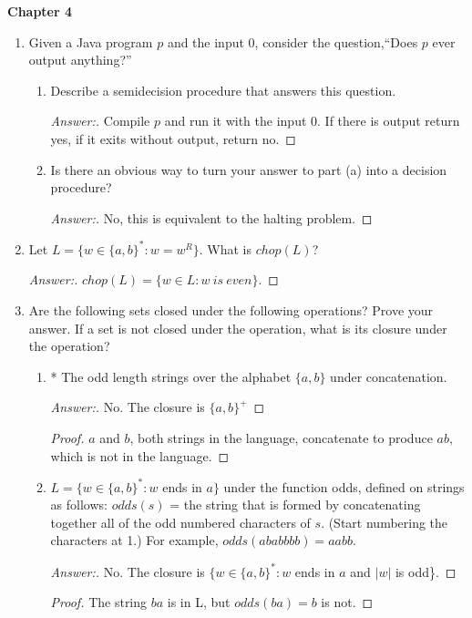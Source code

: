 \documentclass[10pt]{article}
\newcommand{\card}[1]{\left| #1 \right|}
\newcommand{\chtitle}[1]{\noindent \vspace{5mm}\textbf{Chapter #1}\vspace{3mm}}
\begin{document}
\chtitle{4}
\begin{enumerate}


\item
Given a Java program $p$ and the input $0$, consider the question,``Does $p$ ever output anything?''
\begin{enumerate}

\item
Describe a semidecision procedure that answers this question.
\begin{proof}[Answer:]
Compile $p$ and run it with the input $0$.  If there is output return yes, if it exits without output, return no.
\end{proof}

\item
Is there an obvious way to turn your answer to part (a) into a decision procedure?
\begin{proof}[Answer:]
No, this is equivalent to the halting problem.
\end{proof}
\end{enumerate}


\item
Let $L = \{w \in \{a, b\}^*: w = w^R\}$.  What is $chop(L)$? 
\begin{proof}[Answer:]
$chop(L) = \{w \in L: w\ is\ even\}$.
\end{proof}


\item
Are the following sets closed under the following operations?  Prove your answer.  If a set is not closed under the operation, what is its closure under the operation?

\begin{enumerate}

\item
* The odd length strings over the alphabet $\{a, b\}$ under concatenation.
\begin{proof}[Answer:]
No.  The closure is $\{a, b\}^+$
\end{proof}
\begin{proof}
$a$ and $b$, both strings in the language, concatenate to produce $ab$, which is not in the language.
\end{proof}

\item
$L = \{w \in \{a, b\}^* : w$ ends in $a\}$ under the function odds, defined on strings as follows: \linebreak $odds(s)$ = the string that is formed by concatenating together all of the odd numbered \linebreak characters of $s$.  (Start numbering the characters at 1.)  For example, $odds(ababbbb) = aabb$.
\begin{proof}[Answer:]
No. The closure is $\{w \in \{a, b\}^* : w$ ends in $a$ and $\card{w}$ is odd\}.
\end{proof}
\begin{proof}
The string $ba$ is in L, but $odds(ba) = b$ is not.
\end{proof}


\end{enumerate}
\end{enumerate}
\end{document}
